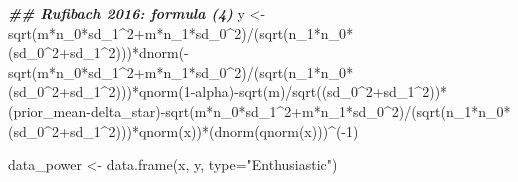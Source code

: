 \documentclass[
]{book}
\newenvironment{Shaded}{\begin{snugshade}}{\end{snugshade}}
\newcommand{\AttributeTok}[1]{\textcolor[rgb]{0.77,0.63,0.00}{#1}}
\newcommand{\DecValTok}[1]{\textcolor[rgb]{0.00,0.00,0.81}{#1}}
\newcommand{\DocumentationTok}[1]{\textcolor[rgb]{0.56,0.35,0.01}{\textbf{\textit{#1}}}}
\newcommand{\FunctionTok}[1]{\textcolor[rgb]{0.00,0.00,0.00}{#1}}
\newcommand{\NormalTok}[1]{#1}
\newcommand{\OtherTok}[1]{\textcolor[rgb]{0.56,0.35,0.01}{#1}}
\newcommand{\SpecialCharTok}[1]{\textcolor[rgb]{0.00,0.00,0.00}{#1}}
\newcommand{\StringTok}[1]{\textcolor[rgb]{0.31,0.60,0.02}{#1}}
\begin{document}
\begin{Shaded}
\begin{Highlighting}[]
\DocumentationTok{\#\# Rufibach 2016: formula (4)}
\NormalTok{y }\OtherTok{\textless{}{-}} \FunctionTok{sqrt}\NormalTok{(m}\SpecialCharTok{*}\NormalTok{n\_0}\SpecialCharTok{*}\NormalTok{sd\_1}\SpecialCharTok{\^{}}\DecValTok{2}\SpecialCharTok{+}\NormalTok{m}\SpecialCharTok{*}\NormalTok{n\_1}\SpecialCharTok{*}\NormalTok{sd\_0}\SpecialCharTok{\^{}}\DecValTok{2}\NormalTok{)}\SpecialCharTok{/}\NormalTok{(}\FunctionTok{sqrt}\NormalTok{(n\_1}\SpecialCharTok{*}\NormalTok{n\_0}\SpecialCharTok{*}\NormalTok{(sd\_0}\SpecialCharTok{\^{}}\DecValTok{2}\SpecialCharTok{+}\NormalTok{sd\_1}\SpecialCharTok{\^{}}\DecValTok{2}\NormalTok{)))}\SpecialCharTok{*}\FunctionTok{dnorm}\NormalTok{(}\SpecialCharTok{{-}}\FunctionTok{sqrt}\NormalTok{(m}\SpecialCharTok{*}\NormalTok{n\_0}\SpecialCharTok{*}\NormalTok{sd\_1}\SpecialCharTok{\^{}}\DecValTok{2}\SpecialCharTok{+}\NormalTok{m}\SpecialCharTok{*}\NormalTok{n\_1}\SpecialCharTok{*}\NormalTok{sd\_0}\SpecialCharTok{\^{}}\DecValTok{2}\NormalTok{)}\SpecialCharTok{/}\NormalTok{(}\FunctionTok{sqrt}\NormalTok{(n\_1}\SpecialCharTok{*}\NormalTok{n\_0}\SpecialCharTok{*}\NormalTok{(sd\_0}\SpecialCharTok{\^{}}\DecValTok{2}\SpecialCharTok{+}\NormalTok{sd\_1}\SpecialCharTok{\^{}}\DecValTok{2}\NormalTok{)))}\SpecialCharTok{*}\FunctionTok{qnorm}\NormalTok{(}\DecValTok{1}\SpecialCharTok{{-}}\NormalTok{alpha)}\SpecialCharTok{{-}}\FunctionTok{sqrt}\NormalTok{(m)}\SpecialCharTok{/}\FunctionTok{sqrt}\NormalTok{((sd\_0}\SpecialCharTok{\^{}}\DecValTok{2}\SpecialCharTok{+}\NormalTok{sd\_1}\SpecialCharTok{\^{}}\DecValTok{2}\NormalTok{))}\SpecialCharTok{*}\NormalTok{(prior\_mean}\SpecialCharTok{{-}}\NormalTok{delta\_star)}\SpecialCharTok{{-}}\FunctionTok{sqrt}\NormalTok{(m}\SpecialCharTok{*}\NormalTok{n\_0}\SpecialCharTok{*}\NormalTok{sd\_1}\SpecialCharTok{\^{}}\DecValTok{2}\SpecialCharTok{+}\NormalTok{m}\SpecialCharTok{*}\NormalTok{n\_1}\SpecialCharTok{*}\NormalTok{sd\_0}\SpecialCharTok{\^{}}\DecValTok{2}\NormalTok{)}\SpecialCharTok{/}\NormalTok{(}\FunctionTok{sqrt}\NormalTok{(n\_1}\SpecialCharTok{*}\NormalTok{n\_0}\SpecialCharTok{*}\NormalTok{(sd\_0}\SpecialCharTok{\^{}}\DecValTok{2}\SpecialCharTok{+}\NormalTok{sd\_1}\SpecialCharTok{\^{}}\DecValTok{2}\NormalTok{)))}\SpecialCharTok{*}\FunctionTok{qnorm}\NormalTok{(x))}\SpecialCharTok{*}\NormalTok{(}\FunctionTok{dnorm}\NormalTok{(}\FunctionTok{qnorm}\NormalTok{(x)))}\SpecialCharTok{\^{}}\NormalTok{(}\SpecialCharTok{{-}}\DecValTok{1}\NormalTok{)}

\NormalTok{data\_power }\OtherTok{\textless{}{-}} \FunctionTok{data.frame}\NormalTok{(x, y, }\AttributeTok{type=}\StringTok{"Enthusiastic"}\NormalTok{)}


\end{Highlighting}
\end{Shaded}
\end{document}

